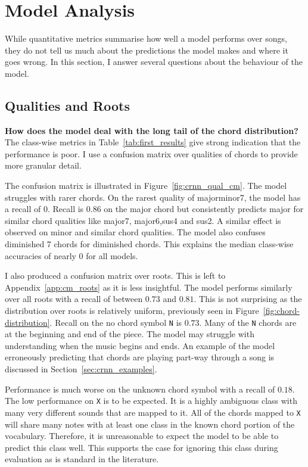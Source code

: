 \section{Model Analysis}\label{sec:crnn_analysis}

While quantitative metrics summarise how well a model performs over songs, they do not tell us much about the predictions the model makes and where it goes wrong. In this section, I answer several questions about the behaviour of the model.

\subsection{Qualities and Roots}

\textbf{How does the model deal with the long tail of the chord distribution?} The class-wise metrics in Table~\ref{tab:first_results} give strong indication that the performance is poor. I use a confusion matrix over qualities of chords to provide more granular detail. 

The confusion matrix is illustrated in Figure~\ref{fig:crnn_qual_cm}. The model struggles with rarer chords. On the rarest quality of majorminor7, the model has a recall of $0$. Recall is $0.86$ on the major chord but consistently predicts major for similar chord qualities like major7, major6,sus4 and sus2. A similar effect is observed on minor and similar chord qualities. The model also confuses diminished 7 chords for diminished chords. This explains the median class-wise accuracies of nearly $0$ for all models.

I also produced a confusion matrix over roots. This is left to Appendix~\ref{app:cm_roots} as it is less insightful. The model performs similarly over all roots with a recall of between $0.73$ and $0.81$. This is not surprising as the distribution over roots is relatively uniform, previously seen in Figure~\ref{fig:chord-distribution}. Recall on the no chord symbol \texttt{N} is $0.73$. Many of the \texttt{N} chords are at the beginning and end of the piece. The model may struggle with understanding when the music begins and ends. An example of the model erroneously predicting that chords are playing part-way through a song is discussed in Section~\ref{sec:crnn_examples}.

Performance is much worse on the unknown chord symbol with a recall of $0.18$. The low performance on \texttt{X} is to be expected. It is a highly ambiguous class with many very different sounds that are mapped to it. All of the chords mapped to \texttt{X} will share many notes with at least one class in the known chord portion of the vocabulary. Therefore, it is unreasonable to expect the model to be able to predict this class well. This supports the case for ignoring this class during evaluation as is standard in the literature.

